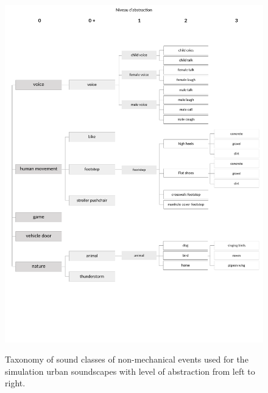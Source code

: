\documentclass[preprint,12pt]{elsarticle}
\begin{document}
\begin{figure}[h]
    \centering
        {\includegraphics[trim={ 0 0 0cm 1cm},clip,width=.7\columnwidth]{gfx/ch_5/event_2_en}\label{fig:taxonomieEventb}}
       \caption{Taxonomy of sound classes of non-mechanical events used for the simulation urban soundscapes with level of abstraction from left to right.}
       \label{fig:taxonomieEb}
\end{figure}
\end{document}
